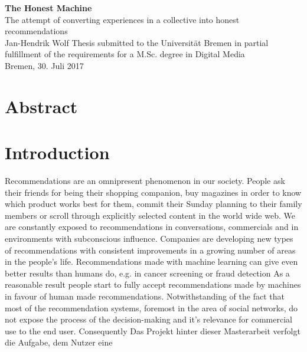 \documentclass[12pt,numbers=noenddot,parskip,bibliography=totocnumbered,listof=totocnumbered]{scrreprt}
\begin{document}
	
\begin{titlepage}
\null
\vfill

\Huge\textsf{\textbf{The Honest Machine
\vspace{0.5em}}}\\
\LARGE\textsf{ The attempt of converting experiences in a collective into honest recommendations }
\vspace{1.5em}\\
\Large\textsf{Jan-Hendrik Wolf}
\vfill
\vfill
\vfill
\small{Thesis submitted to the Universität Bremen in partial fulfillment of the requirements for a M.Sc. degree in Digital Media\\
Bremen, 30. Juli 2017}
\end{titlepage}

\thispagestyle{nochapternumber}

\tableofcontents

\chapter*{Abstract}

\chapter{Introduction}
Recommendations are an omnipresent phenomenon in our society. People ask their friends for being their shopping companion, buy magazines in order to know which product works best for them, commit their Sunday planning to their family members or scroll through explicitly selected content in the world wide web. We are constantly exposed to recommendations in conversations, commercials and in environments with subconscious influence. Companies are developing new types of recommendations with consistent improvements in a growing number of areas in the people's life. Recommendations made with machine learning can give even better results than humans do, e.g. in cancer screening or fraud detection \citep{mldoctors} As a reasonable result people start to fully accept recommendations made by machines in favour of human made recommendations. Notwithstanding of the fact that most of the recommendation systems, foremost in the area of social networks, do not expose the process of the decision-making and it's relevance for commercial use to the end user. Consequently
Das Projekt hinter dieser Masterarbeit verfolgt die Aufgabe, dem Nutzer eine 
\end{document}
